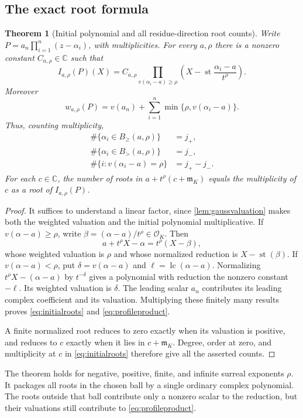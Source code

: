 \documentclass[11pt,letterpaper]{article}
\numberwithin{equation}{section}
\newtheorem{theorem}{Theorem}[section]
\theoremstyle{definition}
\theoremstyle{remark}\newtheorem{remark}[theorem]{Remark}
\newcommand{\C}{\mathbb C}
\newcommand{\OO}{\mathcal O}
\newcommand{\mm}{\mathfrak m}
\newcommand{\st}{\operatorname{st}}
\newcommand{\lc}{\operatorname{lc}}
\newcommand{\Bge}[2]{B_{\ge}(#1,#2)}
\newcommand{\Bgt}[2]{B_{>}(#1,#2)}
\begin{document}
\subsection{The exact root formula}
\begin{theorem}[Initial polynomial and all residue-direction root counts]
\label{thm:initialroots}
Write $P=a_n\prod_{i=1}^n(z-\alpha_i)$, with multiplicities. For every
$a,\rho$ there is a nonzero constant $C_{a,\rho}\in\C$ such that
\begin{equation}\label{eq:initialroots}
 \boxed{\displaystyle
 I_{a,\rho}(P)(X)=C_{a,\rho}
 \prod_{v(\alpha_i-a)\ge\rho}
 \left(X-\st\frac{\alpha_i-a}{t^\rho}\right).}
\end{equation}
Moreover
\begin{equation}\label{eq:profileproduct}
 w_{a,\rho}(P)=v(a_n)+\sum_{i=1}^n\min\{\rho,v(\alpha_i-a)\}.
\end{equation}
Thus, counting multiplicity,
\begin{align}
 \#\{\alpha_i\in\Bge a\rho\}&=j_+,\label{eq:closedcount}\\
 \#\{\alpha_i\in\Bgt a\rho\}&=j_-,\label{eq:opencount}\\
 \#\{i:v(\alpha_i-a)=\rho\}&=j_+-j_- .\label{eq:shellcount}
\end{align}
For each $c\in\C$, the number of roots in
$a+t^\rho(c+\mm_K)$ equals the multiplicity of $c$ as a root of
$I_{a,\rho}(P)$.
\end{theorem}
\begin{proof}
It suffices to understand a linear factor, since
\cref{lem:gaussvaluation} makes both the weighted valuation and the
initial polynomial multiplicative. If $v(\alpha-a)\ge\rho$, write
$\beta=(\alpha-a)/t^\rho\in\OO_K$. Then
\[
 a+t^\rho X-\alpha=t^\rho(X-\beta),
\]
whose weighted valuation is $\rho$ and whose normalized reduction is
$X-\st(\beta)$. If $v(\alpha-a)<\rho$, put
$\delta=v(\alpha-a)$ and $\ell=\lc(\alpha-a)$. Normalizing
$t^\rho X-(\alpha-a)$ by $t^{-\delta}$ gives a polynomial with
reduction the nonzero constant $-\ell$. Its weighted valuation is
$\delta$. The leading scalar $a_n$ contributes its leading complex
coefficient and its valuation. Multiplying these finitely many results
proves \eqref{eq:initialroots} and \eqref{eq:profileproduct}.

A finite normalized root reduces to zero exactly when its valuation
is positive, and reduces to $c$ exactly when it lies in $c+\mm_K$.
Degree, order at zero, and multiplicity at $c$ in
\eqref{eq:initialroots} therefore give all the asserted counts.
\end{proof}
The theorem holds for negative, positive, finite, and infinite surreal
exponents $\rho$. It packages all roots in the chosen ball by a single
ordinary complex polynomial. The roots outside that ball contribute
only a nonzero scalar to the reduction, but their valuations still
contribute to \eqref{eq:profileproduct}.
\end{document}
